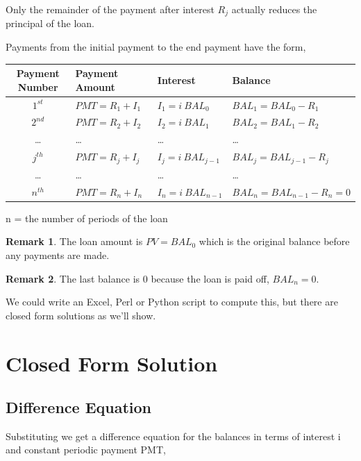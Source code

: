 \documentclass{article}
\theoremstyle{definition} %
\theoremstyle{definition} %
\newtheorem{remark}{Remark}
\theoremstyle{remark} %
\begin{document}
Only the remainder of the payment after interest  $R_j$ actually reduces the principal of the loan.

Payments from the initial payment to the end payment have the form,

\bigskip %

\begin{tabular}{ clll }
\toprule
Payment Number & Payment Amount  & Interest & Balance \\
\midrule
${1^{st}}$   &   $PMT = R_1 + I_1$   &   $I_1 = i \: BAL_0$   &  $BAL_1 = BAL_0 - R_1$  \\
$2^{nd}$    &   $PMT = R_2 + I_2$   &  $I_2 = i \: BAL_1 $   & $BAL_2 = BAL_1 - R_2$ \\
\ldots & \ldots & \ldots & \ldots \\
$j^{th}$      &  $PMT = R_j + I_j$      & $I_j = i \: BAL_{j-1}$  &  $BAL_j = BAL_{j-1} - R_j$ \\
\ldots & \ldots & \ldots & \ldots \\
$n^{th}$      &  $PMT = R_n + I_n$  & $I_n = i \: BAL_{n-1}$ &  $BAL_n= BAL_{n-1} - R_n = 0 $ \\
\bottomrule
\end{tabular}

\bigskip

n = the number of periods of the loan

\begin{remark}
The loan amount is $PV = BAL_0$ which is the original balance before any payments are made.
\end{remark}

\begin{remark}
The last balance is 0 because the loan is paid off, $BAL_n = 0$.
\end{remark}

We could write an Excel, Perl or Python script to compute this, but there are closed form solutions as we'll show.

\pagebreak 

\section{Closed Form Solution}

\subsection{Difference Equation}

Substituting we get a difference equation for the balances in terms of interest i and constant periodic payment PMT,
\end{document}
